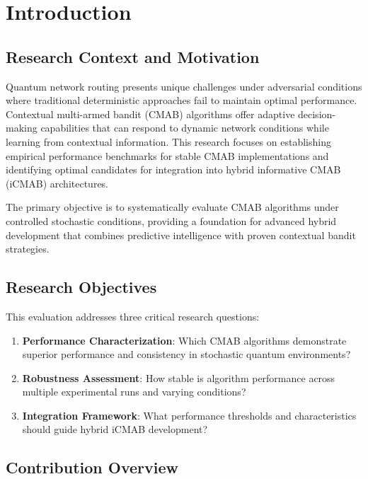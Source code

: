 \documentclass[12pt,a4paper]{article}
\begin{document}
\section{Introduction}

\subsection{Research Context and Motivation}

Quantum network routing presents unique challenges under adversarial conditions where traditional deterministic approaches fail to maintain optimal performance. Contextual multi-armed bandit (CMAB) algorithms offer adaptive decision-making capabilities that can respond to dynamic network conditions while learning from contextual information. This research focuses on establishing empirical performance benchmarks for stable CMAB implementations and identifying optimal candidates for integration into hybrid informative CMAB (iCMAB) architectures.

The primary objective is to systematically evaluate CMAB algorithms under controlled stochastic conditions, providing a foundation for advanced hybrid development that combines predictive intelligence with proven contextual bandit strategies.

\subsection{Research Objectives}

This evaluation addresses three critical research questions:

\begin{enumerate}
\item \textbf{Performance Characterization}: Which CMAB algorithms demonstrate superior performance and consistency in stochastic quantum environments?
\item \textbf{Robustness Assessment}: How stable is algorithm performance across multiple experimental runs and varying conditions?
\item \textbf{Integration Framework}: What performance thresholds and characteristics should guide hybrid iCMAB development?
\end{enumerate}

\subsection{Contribution Overview}
\end{document}
